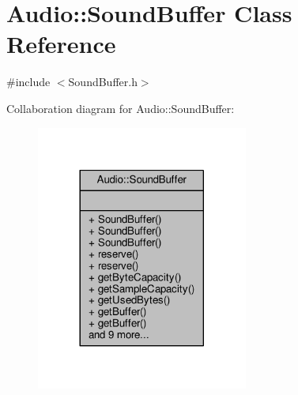 \hypertarget{classAudio_1_1SoundBuffer}{}\section{Audio\+:\+:Sound\+Buffer Class Reference}
\label{classAudio_1_1SoundBuffer}


{\ttfamily \#include $<$Sound\+Buffer.\+h$>$}



Collaboration diagram for Audio\+:\+:Sound\+Buffer\+:
\nopagebreak
\begin{figure}[H]
\begin{center}
\leavevmode
\includegraphics[width=197pt]{d0/d79/classAudio_1_1SoundBuffer__coll__graph}
\end{center}
\end{figure}
